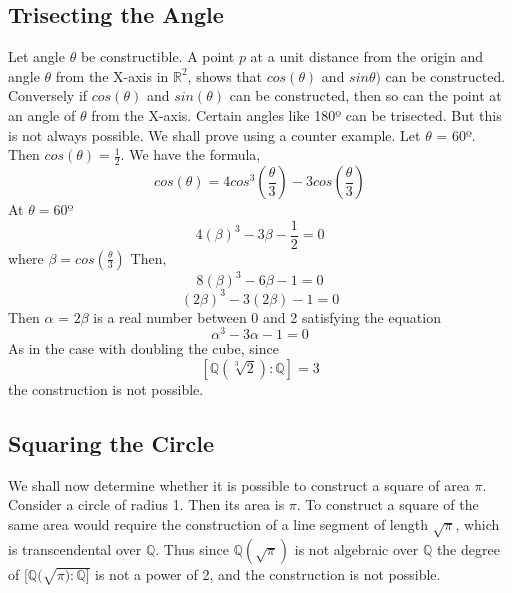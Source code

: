 \documentclass[a4paper, 10pt]{article}
\theoremstyle{plain}
\theoremstyle{definition}
\theoremstyle{remark}
\begin{document}
 \subsection{Trisecting the Angle}
 Let angle $\theta$ be constructible. A point $p$ at a unit distance from the origin and angle $\theta$ from the X-axis in $\mathbb R^2$, shows that $cos(\theta)$ and $sin\theta)$ can be constructed. Conversely if $cos(\theta)$ and $sin(\theta)$ can be constructed, then so can the point at an angle of $\theta$ from the X-axis. Certain angles like 180º can be trisected. But this is not always possible. We shall prove using a counter example. Let $\theta$ = 60º. Then $cos(\theta) = \frac{1}{2}$. We have the formula, $$cos(\theta) = 4cos^3(\frac{\theta}{3})- 3cos(\frac{\theta}{3})$$ At $\theta = 60º$ $$4(\beta)^3 - 3\beta - \frac{1}{2} = 0$$ where $\beta = cos(\frac{\theta}{3})$ Then, $$8(\beta)^3 - 6\beta - 1 = 0 $$ $$(2\beta)^3 - 3(2\beta) - 1 = 0$$ Then $\alpha$ = $2\beta$ is a real number between 0 and 2 satisfying the equation $$\alpha^3 - 3\alpha -1 = 0$$ As in the case with doubling the cube, since $$[\mathbb{Q}(\sqrt[3]{2}) : \mathbb{Q}] = 3 $$ the construction is not possible.
 \subsection{Squaring the Circle}
 We shall now determine whether it is possible to construct a square of area $\pi$. Consider a circle of radius 1. Then its area is $\pi$. To construct a square of the same area would require the construction of a line segment of length $\sqrt{\pi}$, which is transcendental over $\mathbb{Q}$. Thus since $\mathbb{Q}(\sqrt{\pi})$ is not algebraic over $\mathbb{Q}$ the degree of $[\mathbb{Q}(\sqrt{\pi) : \mathbb{Q}] }$ is not a power of 2, and the construction is not possible.
\end{document}
